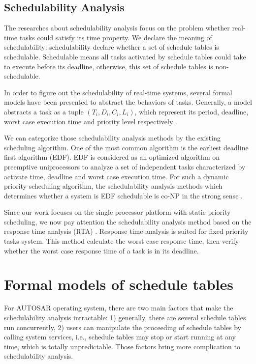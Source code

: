 \documentclass[sigconf]{acmart}
\begin{document}
\subsection{Schedulability Analysis}
The researches about schedulability analysis focus on the problem whether real-time tasks could satisfy its time property. We declare the meaning of schedulability: schedulability declare whether a set of schedule tables is schedulable. Schedulable means all tasks activated by schedule tables could take to execute before its deadline, otherwise, this set of schedule tables is non-schedulable.

In order to figure out the schedulability of real-time systems, several formal models have been presented to abstract the behaviors of tasks. Generally, a model abstracts a task as a tuple $(T_i,D_i,C_i,L_i)$, which represent its period, deadline, worst case execution time and priority level respectively \cite{DBLP:journals/csur/BurnsD17}. 

We can categorize those schedulability analysis methods by the existing scheduling algorithm. One of the most common algorithm is the earliest deadline first algorithm (EDF). EDF is considered as an optimized algorithm on preemptive uniprocessors to analyze a set of independent tasks characterized by activate time, deadline and worst case execution time. For such a dynamic priority scheduling algorithm, the schedulability analysis methods which determines whether a system is EDF schedulable is co-NP in the strong sense \cite{Goossens:1999:LWC:553897}.

Since our work focuses on the single processor platform with static priority scheduling, we now pay attention the schedulability analysis method based on the response time analysis (RTA) \cite{DBLP:journals/iee/AudsleyBRTW93}. Response time analysis is suited for fixed priority tasks system. This method calculate the worst case response time, then verify whether the worst case response time of a task is in its deadline. 

\section{Formal models of schedule tables} 
For AUTOSAR operating system, there are two main factors that make the schedulability analysis intractable: 1) generally, there are several schedule tables run concurrently, 2) users can manipulate the proceeding of schedule tables by calling system services, i.e., schedule tables may stop or start running at any time, which is totally unpredictable. Those factors bring more complication to schedulability analysis. 
\end{document}
